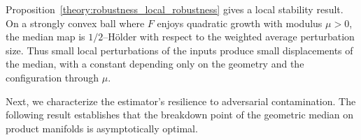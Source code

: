 \documentclass[10pt]{article}
\begin{document}

Proposition~\ref{theory:robustness_local_robustness} gives a local stability result. On a strongly convex ball where $F$ enjoys quadratic growth with modulus $\mu>0$, the median map is $1/2$–H\"{o}lder with respect to the weighted average perturbation size. Thus small local perturbations of the inputs produce small displacements of the median, with a constant depending only on the geometry and the configuration through $\mu$. 



Next, we characterize the estimator's resilience to adversarial contamination. The following result establishes that the breakdown point of the geometric median on product manifolds is asymptotically optimal.
\end{document}
